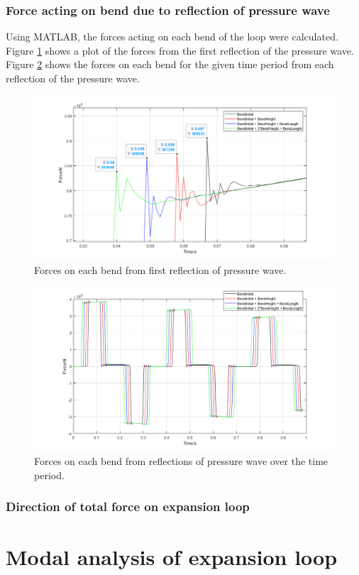 \subsubsection{Force acting on bend due to reflection of pressure wave}
Using MATLAB, the forces acting on each bend of the loop were calculated. Figure \ref{force1} shows a plot of the forces from the first reflection of the pressure wave. Figure \ref{force2} shows the forces on each bend for the given time period from each reflection of the pressure wave.
\begin{figure}[H]
    \centering
    \includegraphics[width = 0.9 \textwidth]{img/fig5.png}
    \caption{Forces on each bend from first reflection of pressure wave.}
    \label{force1}
\end{figure}
\begin{figure}[H]
    \centering
    \includegraphics[width = 0.9 \textwidth]{img/fig6.png}
    \caption{Forces on each bend from reflections of pressure wave over the time period.}
    \label{force2}
\end{figure}
\subsubsection{Direction of total force on expansion loop}
\section{Modal analysis of expansion loop}
